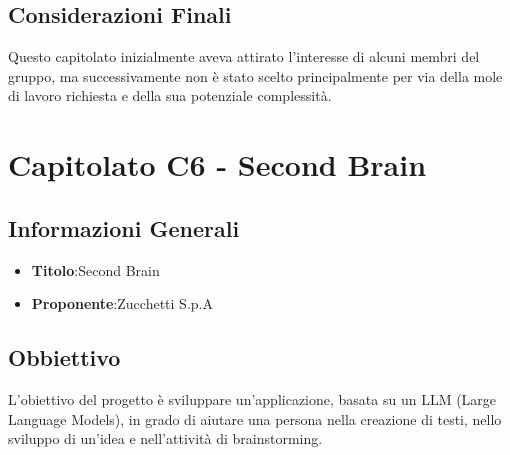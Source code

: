 \documentclass[a4paper,12pt]{article}
\begin{document}
    \subsection{Considerazioni Finali}
    Questo capitolato inizialmente aveva attirato l’interesse di alcuni membri del gruppo, ma successivamente non è stato scelto principalmente per via della mole di lavoro richiesta e della sua potenziale complessità.


    \section{Capitolato C6 - Second Brain}
    \subsection{Informazioni Generali}
        \begin{itemize}
            \item \textbf{Titolo}:Second Brain
            \item \textbf{Proponente}:Zucchetti S.p.A
        \end{itemize}
    \subsection{Obbiettivo}
    L’obiettivo del progetto è sviluppare un’applicazione, basata su un LLM (Large Language Models), in grado di aiutare una persona nella creazione di testi, nello sviluppo di un’idea e nell’attività di brainstorming.
\end{document}
